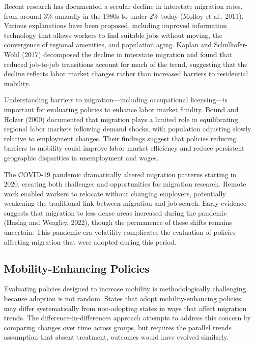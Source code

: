 \documentclass[12pt]{article}
\begin{document}
Recent research has documented a secular decline in interstate migration rates, from around 3\% annually in the 1980s to under 2\% today (Molloy et al., 2011). Various explanations have been proposed, including improved information technology that allows workers to find suitable jobs without moving, the convergence of regional amenities, and population aging. Kaplan and Schulhofer-Wohl (2017) decomposed the decline in interstate migration and found that reduced job-to-job transitions account for much of the trend, suggesting that the decline reflects labor market changes rather than increased barriers to residential mobility.

Understanding barriers to migration---including occupational licensing---is important for evaluating policies to enhance labor market fluidity. Bound and Holzer (2000) documented that migration plays a limited role in equilibrating regional labor markets following demand shocks, with population adjusting slowly relative to employment changes. Their findings suggest that policies reducing barriers to mobility could improve labor market efficiency and reduce persistent geographic disparities in unemployment and wages.

The COVID-19 pandemic dramatically altered migration patterns starting in 2020, creating both challenges and opportunities for migration research. Remote work enabled workers to relocate without changing employers, potentially weakening the traditional link between migration and job search. Early evidence suggests that migration to less dense areas increased during the pandemic (Haslag and Weagley, 2022), though the permanence of these shifts remains uncertain. This pandemic-era volatility complicates the evaluation of policies affecting migration that were adopted during this period.

\subsection{Mobility-Enhancing Policies}

Evaluating policies designed to increase mobility is methodologically challenging because adoption is not random. States that adopt mobility-enhancing policies may differ systematically from non-adopting states in ways that affect migration trends. The difference-in-differences approach attempts to address this concern by comparing changes over time across groups, but requires the parallel trends assumption that absent treatment, outcomes would have evolved similarly.
\end{document}
